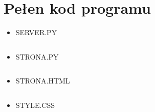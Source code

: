 \documentclass[12pt,a4paper]{article}
\begin{document}
	\section*{Pełen kod programu}

	\begin{itemize}
	\item SERVER.PY
	\begin{lstlisting}[language=Python]


	\end{lstlisting}

	\item STRONA.PY
	\begin{lstlisting}[language=Python]

	\end{lstlisting}
	
	\item STRONA.HTML
	\begin{lstlisting}[language=Html]

	\end{lstlisting}
	
	\item STYLE.CSS
	\begin{lstlisting}

	\end{lstlisting}
	\end{itemize}
\end{document}
